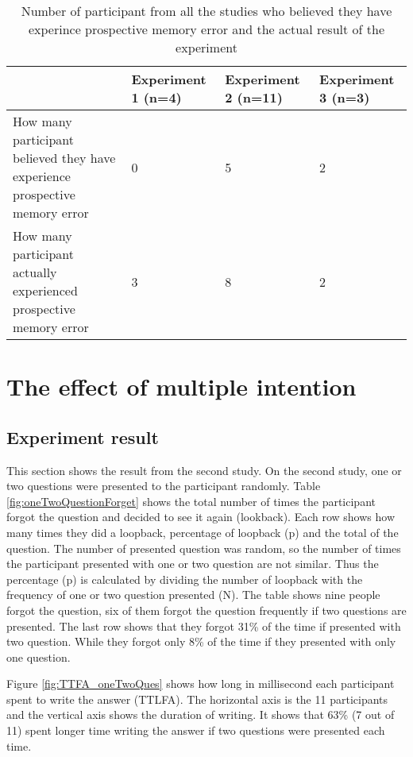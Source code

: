 \begin{table}[]
\centering
\small
\footnotesize
\begin{tabu}{|X[6,l]|X[2,c]|X[2,c]|X[2,c]|}
\hline
                                                                           & Experiment 1 (n=4) & Experiment 2 (n=11) & Experiment 3 (n=3) \\ \hline
How many participant believed they have experience prospective memory error & 0                  & 5                   & 2                  \\ \hline
How many participant actually experienced prospective memory error          & 3                  & 8                   & 2                  \\ \hline
\end{tabu}
\caption{Number of participant from all the studies who believed they have experince prospective memory error and the actual result of the experiment}
\label{fig:affirmationTable}
\end{table}



\section{The effect of multiple intention}

\subsection{Experiment result}
This section shows the result from the second study. On the second study, one or two questions were presented to the participant randomly.
Table \ref{fig:oneTwoQuestionForget} shows the total number of times the participant forgot the question and decided to see it again (lookback).
Each row shows how many times they did a loopback, percentage of loopback (p) and the total of the question.
The number of presented question was random, so the number of times the participant presented with
one or two question are not similar. Thus the percentage (p) is calculated by dividing the number of loopback with the frequency of one or two question
presented (N).
The table shows nine people forgot the question, six of them forgot the question frequently if two questions are presented.
The last row shows that they forgot 31\% of the time if presented with two question.
While they forgot only 8\% of the time if they presented with only one question.

Figure \ref{fig:TTFA_oneTwoQues} shows how long in millisecond each participant spent to write the answer (TTLFA).
The horizontal axis is the 11 participants and the vertical axis shows the duration of writing.
 It shows that 63\% (7 out of 11) spent longer time writing the answer if two questions were presented each time.

